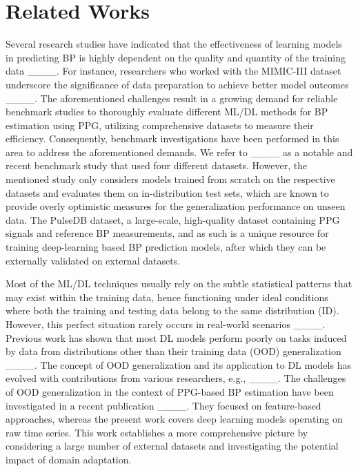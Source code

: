 \section{Related Works}
\label{sec:II}

\label{sec:II-B}
Several research studies have indicated that the effectiveness of learning models in predicting BP is highly dependent on the quality and quantity of the training data ____. For instance,  researchers who worked with the MIMIC-III dataset underscore the significance of data preparation to achieve better model outcomes ____. The aforementioned challenges result in a growing demand for reliable benchmark studies to thoroughly evaluate different ML/DL methods for BP estimation using PPG, utilizing comprehensive datasets to measure their efficiency. Consequently, benchmark investigations have been performed in this area to address the aforementioned demands. We refer to ____ as a notable and recent benchmark study that used four different datasets. 
However, the mentioned study only considers models trained from scratch on the respective datasets and evaluates them on in-distribution test sets, which are known to provide overly optimistic measures for the generalization performance on unseen data. The PulseDB dataset, a large-scale, high-quality dataset containing PPG signals and reference BP measurements, and as such is a unique resource for training deep-learning based BP prediction models, after which they can be externally validated on external datasets.



Most of the ML/DL techniques usually rely on the subtle statistical patterns that may exist within the training data, hence functioning under ideal conditions where both the training and testing data belong to the same distribution (ID). However, this perfect situation rarely occurs in real-world scenarios ____. Previous work has shown that most DL models perform poorly on tasks induced by data from distributions other than their training data (OOD) generalization ____. The concept of OOD generalization and its application to DL models has evolved with contributions from various researchers, e.g., ____. 
The challenges of OOD generalization in the context of PPG-based BP estimation have been investigated in a recent publication ____. They focused on feature-based approaches, whereas the present work covers deep learning models operating on raw time series. This work establishes a more comprehensive picture by considering a large number of external datasets and investigating the potential impact of domain adaptation.

